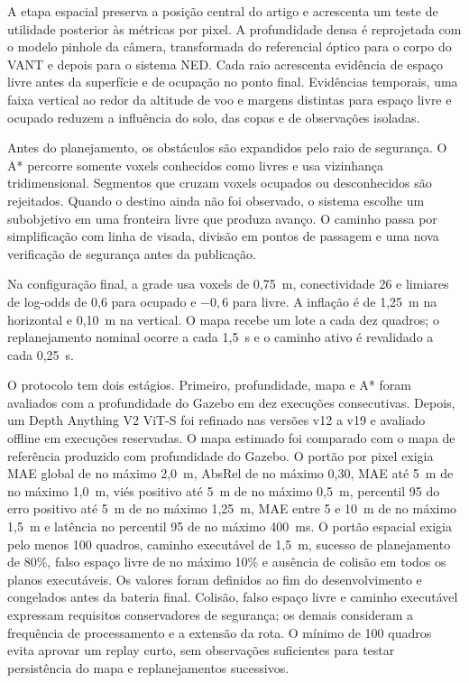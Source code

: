 \documentclass[article,a4paper,12pt,brazil,sumario=tradicional]{abntex2}
\begin{document}
A etapa espacial preserva a posição central do artigo e acrescenta um teste de utilidade posterior às métricas por pixel. A profundidade densa é reprojetada com o modelo pinhole da câmera, transformada do referencial óptico para o corpo do VANT e depois para o sistema NED. Cada raio acrescenta evidência de espaço livre antes da superfície e de ocupação no ponto final. Evidências temporais, uma faixa vertical ao redor da altitude de voo e margens distintas para espaço livre e ocupado reduzem a influência do solo, das copas e de observações isoladas.

Antes do planejamento, os obstáculos são expandidos pelo raio de segurança. O A* percorre somente voxels conhecidos como livres e usa vizinhança tridimensional. Segmentos que cruzam voxels ocupados ou desconhecidos são rejeitados. Quando o destino ainda não foi observado, o sistema escolhe um subobjetivo em uma fronteira livre que produza avanço. O caminho passa por simplificação com linha de visada, divisão em pontos de passagem e uma nova verificação de segurança antes da publicação.

Na configuração final, a grade usa voxels de 0,75~m, conectividade 26 e limiares de log-odds de 0,6 para ocupado e $-0,6$ para livre. A inflação é de 1,25~m na horizontal e 0,10~m na vertical. O mapa recebe um lote a cada dez quadros; o replanejamento nominal ocorre a cada 1,5~s e o caminho ativo é revalidado a cada 0,25~s.

O protocolo tem dois estágios. Primeiro, profundidade, mapa e A* foram avaliados com a profundidade do Gazebo em dez execuções consecutivas. Depois, um Depth Anything V2 ViT-S foi refinado nas versões v12 a v19 e avaliado offline em execuções reservadas. O mapa estimado foi comparado com o mapa de referência produzido com profundidade do Gazebo. O portão por pixel exigia MAE global de no máximo 2,0~m, AbsRel de no máximo 0,30, MAE até 5~m de no máximo 1,0~m, viés positivo até 5~m de no máximo 0,5~m, percentil 95 do erro positivo até 5~m de no máximo 1,25~m, MAE entre 5 e 10~m de no máximo 1,5~m e latência no percentil 95 de no máximo 400~ms. O portão espacial exigia pelo menos 100 quadros, caminho executável de 1,5~m, sucesso de planejamento de 80\%, falso espaço livre de no máximo 10\% e ausência de colisão em todos os planos executáveis. Os valores foram definidos ao fim do desenvolvimento e congelados antes da bateria final. Colisão, falso espaço livre e caminho executável expressam requisitos conservadores de segurança; os demais consideram a frequência de processamento e a extensão da rota. O mínimo de 100 quadros evita aprovar um replay curto, sem observações suficientes para testar persistência do mapa e replanejamentos sucessivos.
\end{document}
